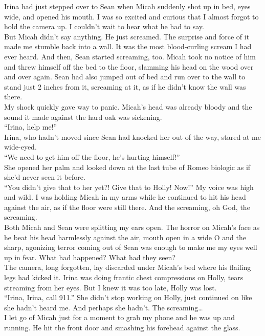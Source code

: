 \documentclass[a5paper]{scrartcl}
\begin{document}
Irina had just stepped over to Sean when Micah suddenly shot up in bed, eyes wide, and opened his mouth. I was so excited and curious that I almost forgot to hold the camera up. I couldn’t wait to hear what he had to say.\\
But Micah didn't say anything. He just screamed. The surprise and force of it made me stumble back into a wall. It was the most blood-curling scream I had ever heard. And then, Sean started screaming, too. Micah took no notice of him and threw himself off the bed to the floor, slamming his head on the wood over and over again. Sean had also jumped out of bed and run over to the wall to stand just 2 inches from it, screaming at it, as if he didn't know the wall was there.\\
My shock quickly gave way to panic. Micah's head was already bloody and the sound it made against the hard oak was sickening.\\
\enquote{Irina, help me!}\\
Irina, who hadn't moved since Sean had knocked her out of the way, stared at me wide-eyed.\\
\enquote{We need to get him off the floor, he's hurting himself!}\\
She opened her palm and looked down at the last tube of Romeo biologic as if she'd never seen it before.\\
\enquote{You didn't give that to her yet?! Give that to Holly! Now!} My voice was high and wild. I was holding Micah in my arms while he continued to hit his head against the air, as if the floor were still there. And the screaming, oh God, the screaming.\\
Both Micah and Sean were splitting my ears open. The horror on Micah's face as he beat his head harmlessly against the air, mouth open in a wide O and the sharp, agonizing terror coming out of Sean was enough to make me my eyes well up in fear. What had happened? What had they seen?\\
The camera, long forgotten, lay discarded under Micah's bed where his flailing legs had kicked it. Irina was doing frantic chest compressions on Holly, tears streaming from her eyes. But I knew it was too late, Holly was lost.\\
\enquote{Irina, Irina, call 911.} She didn't stop working on Holly, just continued on like she hadn't heard me. And perhaps she hadn't. The screaming\dots\\
I let go of Micah just for a moment to grab my phone and he was up and running. He hit the front door and smashing his forehead against the glass.\\
\end{document}
